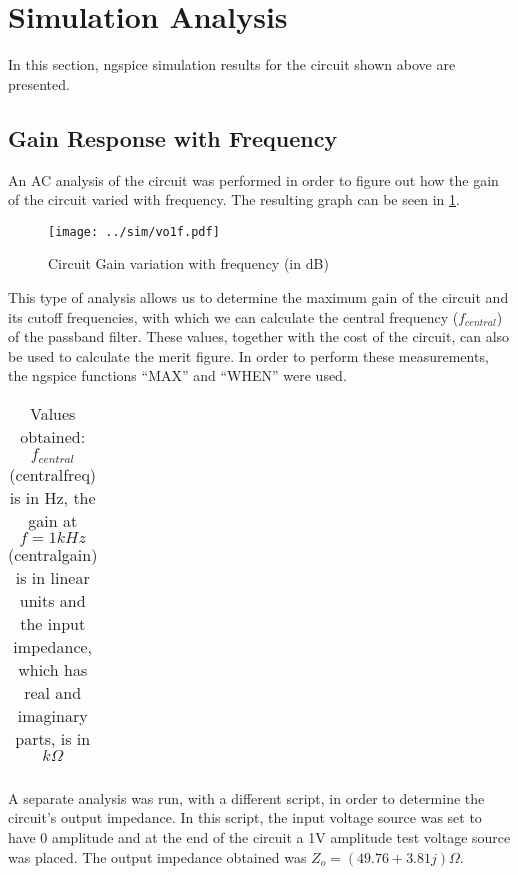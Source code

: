 \section{Simulation Analysis}
\label{sec:simulation}

In this section, ngspice simulation results for the circuit shown above are presented.


\subsection{Gain Response with Frequency}

An AC analysis of the circuit was performed in order to figure out how the gain of the circuit varied with frequency. The resulting graph can be seen in \ref{fig:gain_freq}.

\begin{figure}[H] \centering
\texttt{[image: ../sim/vo1f.pdf]}
\caption{Circuit Gain variation with frequency (in dB)}
\label{fig:gain_freq}
\end{figure}

This type of analysis allows us to determine the maximum gain of the circuit and its cutoff frequencies, with which we can calculate the central frequency ($f_{central}$) of the passband filter. These values, together with the cost of the circuit, can also be used to calculate the merit figure. In order to perform these measurements, the ngspice functions ``MAX'' and ``WHEN'' were used.

\begin{table}[H]
  \centering
  \begin{tabular}{|c|c|}
    \hline
      
  \end{tabular}
  \caption{Values obtained: $f_{central}$ (centralfreq) is in Hz, the gain at $f = 1 kHz$ (centralgain) is in linear units and the input impedance, which has real and imaginary parts, is in $k\Omega$}
  \label{tab:resultssim}
\end{table}

A separate analysis was run, with a different script, in order to determine the circuit's output impedance. In this script, the input voltage source was set to have 0 amplitude and at the end of the circuit a 1V amplitude test voltage source was placed. The output impedance obtained was $Z_o = (49.76 + 3.81j) \Omega$.





